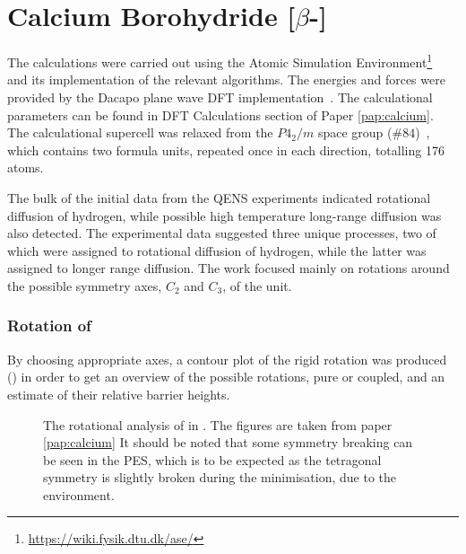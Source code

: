 \section{Calcium Borohydride [$\beta$-]}
\label{sec:borohydrides-calcium}
The calculations were carried out using the Atomic Simulation Environment\footnote{\url{https://wiki.fysik.dtu.dk/ase/}}~\cite{ase-2002} and its implementation of the relevant algorithms.
The energies and forces were provided by the Dacapo plane wave DFT implementation~\cite{dacapo-1999}.
The calculational parameters can be found in DFT Calculations section of Paper \ref{pap:calcium}.
The calculational supercell was relaxed from the $P4_2/m$ space group ($\#84$)~\cite{cabh42-structure-p42m}, which contains two formula units, repeated once in each direction, totalling 176 atoms.

The bulk of the initial data from the QENS experiments indicated rotational diffusion of hydrogen, while possible high temperature long-range diffusion was also detected.
The experimental data suggested three unique processes, two of which were assigned to rotational diffusion of hydrogen, while the latter was assigned to longer range diffusion.
The work focused mainly on rotations around the possible symmetry axes, $C_2$ and $C_3$, of the  unit.

\subsubsection{Rotation of }
By choosing appropriate axes, a contour plot of the rigid rotation was produced () in order to get an overview of the possible rotations, pure or coupled, and an estimate of their relative barrier heights.

\begin{figure}[h]
\begin{center}
    \parbox{0.85\linewidth}{
      \caption{The rotational analysis of  in .
      The figures are taken from paper \ref{pap:calcium}
It should be noted that some symmetry breaking can be seen in the PES, which is to be expected as the tetragonal symmetry is slightly broken during the minimisation, due to the environment.
      }
      \label{fig:ca-rotational}
    }
\end{center}
\end{figure}

